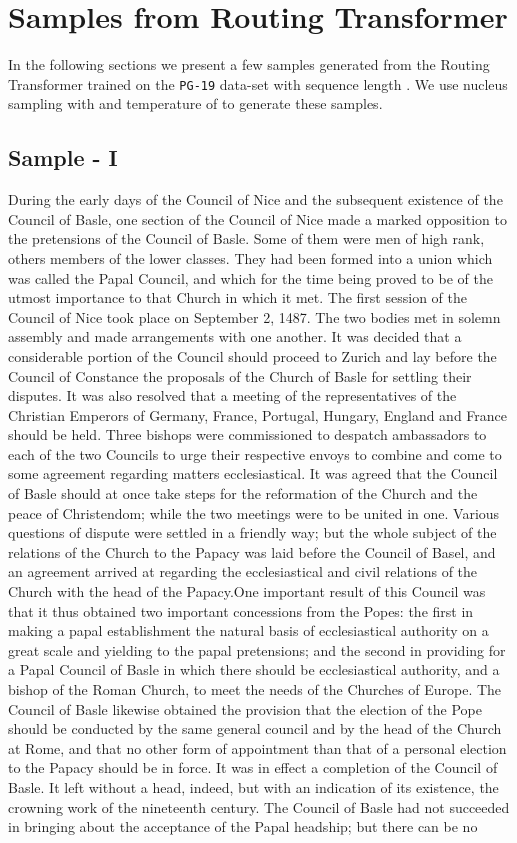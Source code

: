 \documentclass[a4paper]{article}
\begin{document}
\section{Samples from Routing Transformer}\label{sec:sample}
In the following sections we present a few samples generated from the Routing Transformer trained
on the \texttt{PG-19} data-set with sequence length . We use nucleus sampling
\citep{Holtzman2020The} with  and temperature of  to generate these samples. 

\subsection{Sample - I}
During the early days of the Council of Nice and the subsequent existence of the Council of Basle, one section of the Council of Nice made a marked opposition to the pretensions of the Council of Basle. Some of them were men of high rank, others members of the lower classes. They had been formed into a union which was called the Papal Council, and which for the time being proved to be of the utmost importance to that Church in which it met. The first session of the Council of Nice took place on September 2, 1487. The two bodies met in solemn assembly and made arrangements with one another. It was decided that a considerable portion of the Council should proceed to Zurich and lay before the Council of Constance the proposals of the Church of Basle for settling their disputes. It was also resolved that a meeting of the representatives of the Christian Emperors of Germany, France, Portugal, Hungary, England and France should be held. Three bishops were commissioned to despatch ambassadors to each of the two Councils to urge their respective envoys to combine and come to some agreement regarding matters ecclesiastical. It was agreed that the Council of Basle should at once take steps for the reformation of the Church and the peace of Christendom; while the two meetings were to be united in one. Various questions of dispute were settled in a friendly way; but the whole subject of the relations of the Church to the Papacy was laid before the Council of Basel, and an agreement arrived at regarding the ecclesiastical and civil relations of the Church with the head of the Papacy.One important result of this Council was that it thus obtained two important concessions from the Popes: the first in making a papal establishment the natural basis of ecclesiastical authority on a great scale and yielding to the papal pretensions; and the second in providing for a Papal Council of Basle in which there should be ecclesiastical authority, and a bishop of the Roman Church, to meet the needs of the Churches of Europe. The Council of Basle likewise obtained the provision that the election of the Pope should be conducted by the same general council and by the head of the Church at Rome, and that no other form of appointment than that of a personal election to the Papacy should be in force. It was in effect a completion of the Council of Basle. It left without a head, indeed, but with an indication of its existence, the crowning work of the nineteenth century. The Council of Basle had not succeeded in bringing about the acceptance of the Papal headship; but there can be no 
\end{document}

